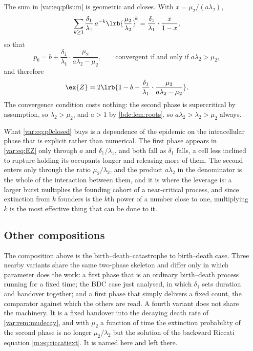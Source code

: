 The sum in \cref{var:eq:p0sum} is geometric and closes. With
$x=\mu_2/(a\lambda_2)$,
\[
\sum_{k\ge1}\frac{\delta_1}{\lambda_1}\,a^{-k}
\lrb{\frac{\mu_2}{\lambda_2}}^{\!k}
=\frac{\delta_1}{\lambda_1}\cdot\frac{x}{1-x},
\]
so that
\begin{equation}
p_0=b+\frac{\delta_1}{\lambda_1}\cdot\frac{\mu_2}{a\lambda_2-\mu_2},
\qquad\text{convergent if and only if } a\lambda_2>\mu_2 ,
\label{var:eq:p0closed}
\end{equation}
and therefore
\begin{equation}
\ex{Z}=2\lrb{1-b-\frac{\delta_1}{\lambda_1}
\cdot\frac{\mu_2}{a\lambda_2-\mu_2}} .
\label{var:eq:EZ}
\end{equation}
The convergence condition costs nothing: the second phase is supercritical by
assumption, so $\lambda_2>\mu_2$, and $a>1$ by \cref{bdc:lem:roots}, so
$a\lambda_2>\lambda_2>\mu_2$ always.

What \cref{var:eq:p0closed} buys is a dependence of the epidemic on the
intracellular phase that is explicit rather than numerical. The first phase
appears in \cref{var:eq:EZ} only through $a$ and $\delta_1/\lambda_1$, and
both fall as $\delta_1$ falls, a cell less inclined to rupture holding its
occupants longer and releasing more of them. The second enters only through
the ratio $\mu_2/\lambda_2$, and the product $a\lambda_2$ in the denominator
is the whole of the interaction between them, and it is where the leverage
is: a larger burst multiplies the founding cohort of a near-critical process,
and since extinction from $k$ founders is the $k$th power of a number close
to one, multiplying $k$ is the most effective thing that can be done to it.

\subsection{Other compositions}
\label{var:sec:variants}

The composition above is the birth--death--catastrophe to birth--death case.
Three nearby variants share the same two-phase skeleton and differ only in
which parameter does the work: a first phase that is an ordinary birth--death
process running for a fixed time; the BDC case just analysed, in which
$\delta_1$ sets duration and handover together; and a first phase that simply
delivers a fixed count, the comparator against which the others are read.
A fourth variant does not share the machinery. It is a fixed handover into
the decaying death rate of \cref{var:rem:mudecay}, and with $\mu_2$ a
function of time the extinction probability of the second phase is no longer
$\mu_2/\lambda_2$ but the solution of the backward Riccati equation
\cref{m:eq:riccatiext}. It is named here and left there.

